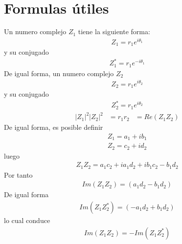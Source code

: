 \section{Formulas útiles}
Un numero complejo $Z_{1}$ tiene la siguiente forma:
\begin{align}
Z_{1}=r_{1}e^{i\theta_{1}}
\end{align}
y su conjugado
\begin{align}
Z_{1}^{*}=r_{1}e^{-i\theta_{1}}
\end{align}
De igual forma, un numero complejo $Z_{2}$
\begin{align}
Z_{2}=r_{1}e^{i\theta_{2}}
\end{align}
y su conjugado
\begin{align}
Z_{2}^{*}=r_{1}e^{i\theta_{2}}
\end{align}
\begin{align}
|Z_{1}|^2|Z_{2}|^2&=r_{1}r_{2}
&=Re(Z_{1}Z_{2})
\end{align}
De igual forma, es posible definir 
\begin{align}
Z_{1}=a_{1}+ib_{1}\nonumber\\
Z_{2}=c_{2}+id_{2}
\end{align}
luego
\begin{align}
Z_{1}Z_{2}=a_{1}c_{2}+ia_{1}d_{2}+ib_{1}c_{2}-b_{1}d_{2}
\end{align}
Por tanto
\begin{align}
Im(Z_{1}Z_{2})=(a_{1}d_{2}-b_{1}d_{2})
\end{align}
De igual forma
\begin{align}
Im(Z_{1}Z_{2}^{*})=(-a_{1}d_{2}+b_{1}d_{2})
\end{align}
lo cual conduce
\begin{align}
Im(Z_{1}Z_{2})=-Im(Z_{1}Z_{2}^{*})
\end{align}
